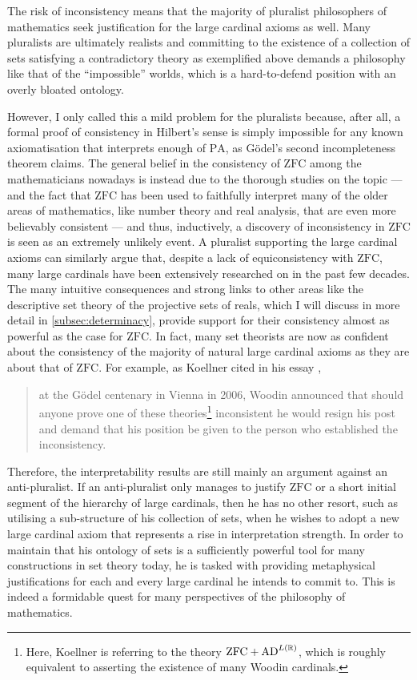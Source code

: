 \documentclass[12pt]{article}
\theoremstyle{plain}
\theoremstyle{definition}
\newcommand{\PA}{\mathrm{PA}}
\newcommand{\ZFC}{\mathrm{ZFC}}
\newcommand{\AD}{\mathrm{AD}}
\begin{document}
The risk of inconsistency means that the majority of pluralist philosophers of mathematics seek justification for the large cardinal axioms as well. Many pluralists are ultimately realists and committing to the existence of a collection of sets satisfying a contradictory theory as exemplified above demands a philosophy like that of the ``impossible'' worlds, which is a hard-to-defend position with an overly bloated ontology.

However, I only called this a mild problem for the pluralists because, after all, a formal proof of consistency in Hilbert's sense is simply impossible for any known axiomatisation that interprets enough of $\PA$, as G\"odel's second incompleteness theorem claims. The general belief in the consistency of $\ZFC$ among the mathematicians nowadays is instead due to the thorough studies on the topic --- and the fact that $\ZFC$ has been used to faithfully interpret many of the older areas of mathematics, like number theory and real analysis, that are even more believably consistent --- and thus, inductively, a discovery of inconsistency in $\ZFC$ is seen as an extremely unlikely event. A pluralist supporting the large cardinal axioms can similarly argue that, despite a lack of equiconsistency with $\ZFC$, many large cardinals have been extensively researched on in the past few decades. The many intuitive consequences and strong links to other areas like the descriptive set theory of the projective sets of reals, which I will discuss in more detail in \autoref{subsec:determinacy}, provide support for their consistency almost as powerful as the case for $\ZFC$. In fact, many set theorists are now as confident about the consistency of the majority of natural large cardinal axioms as they are about that of $\ZFC$. For example, as Koellner cited in his essay \cite{koellner-pluralism},

\begin{quote}
	at the G\"odel centenary in Vienna in 2006, Woodin announced that should anyone prove one of these theories\footnote{Here, Koellner is referring to the theory $\ZFC + \AD^{L\mleft(\mathbb{R}\mright)}$, which is roughly equivalent to asserting the existence of many Woodin cardinals.} inconsistent he would resign his post and demand that his position be given to the person who established the inconsistency.
\end{quote}

Therefore, the interpretability results are still mainly an argument against an anti-pluralist. If an anti-pluralist only manages to justify $\ZFC$ or a short initial segment of the hierarchy of large cardinals, then he has no other resort, such as utilising a sub-structure of his collection of sets, when he wishes to adopt a new large cardinal axiom that represents a rise in interpretation strength. In order to maintain that his ontology of sets is a sufficiently powerful tool for many constructions in set theory today, he is tasked with providing metaphysical justifications for each and every large cardinal he intends to commit to. This is indeed a formidable quest for many perspectives of the philosophy of mathematics.
\end{document}
